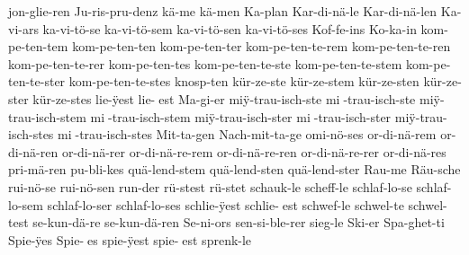 {  jon-glie-ren %
  Ju-ris-pru-denz %
  k^^e4-me %
  k^^e4-men %
  Ka-plan %
  Kar-di-n^^e4-le %
  Kar-di-n^^e4-len %
  Ka-vi-ars %
  ka-vi-t^^f6-se %
  ka-vi-t^^f6-sem %
  ka-vi-t^^f6-sen %
  ka-vi-t^^f6-ses %
  Kof-fe-ins %
  Ko-ka-in %
  kom-pe-ten-tem %
  kom-pe-ten-ten %
  kom-pe-ten-ter %
  kom-pe-ten-te-rem %
  kom-pe-ten-te-ren %
  kom-pe-ten-te-rer %
  kom-pe-ten-tes %
  kom-pe-ten-te-ste %
  kom-pe-ten-te-stem %
  kom-pe-ten-te-ster %
  kom-pe-ten-te-stes %
  knosp-ten %
  k^^fcr-ze-ste %
  k^^fcr-ze-stem %
  k^^fcr-ze-sten %
  k^^fcr-ze-ster %
  k^^fcr-ze-stes %
  lie-^^ffest %
  lie-^^Yest
  Ma-gi-er %
  mi^^ff-trau-isch-ste %
  mi^^Y-trau-isch-ste
  mi^^ff-trau-isch-stem %
  mi^^Y-trau-isch-stem
  mi^^ff-trau-isch-ster %
  mi^^Y-trau-isch-ster
  mi^^ff-trau-isch-stes %
  mi^^Y-trau-isch-stes
  Mit-ta-gen %
  Nach-mit-ta-ge %
  omi-n^^f6-ses %
  or-di-n^^e4-rem %
  or-di-n^^e4-ren %
  or-di-n^^e4-rer %
  or-di-n^^e4-re-rem %
  or-di-n^^e4-re-ren %
  or-di-n^^e4-re-rer %
  or-di-n^^e4-res %
  pri-m^^e4-ren %
  pu-bli-kes %
  qu^^e4-lend-stem %
  qu^^e4-lend-sten %
  qu^^e4-lend-ster %
  Rau-me %
  R^^e4u-sche %
  rui-n^^f6-se %
  rui-n^^f6-sen %
  run-der %
  r^^fc-stest %
  r^^fc-stet %
  schauk-le %
  scheff-le %
  schlaf-lo-se %
  schlaf-lo-sem %
  schlaf-lo-ser %
  schlaf-lo-ses %
  schlie-^^ffest %
  schlie-^^Yest
  schwef-le %
  schwel-te %
  schwel-test %
  se-kun-d^^e4-re %
  se-kun-d^^e4-ren %
  Se-ni-ors %
  sen-si-ble-rer %
  sieg-le %
  Ski-er %
  Spa-ghet-ti %
  Spie-^^ffes %
  Spie-^^Yes
  spie-^^ffest %
  spie-^^Yest
  sprenk-le %
}
